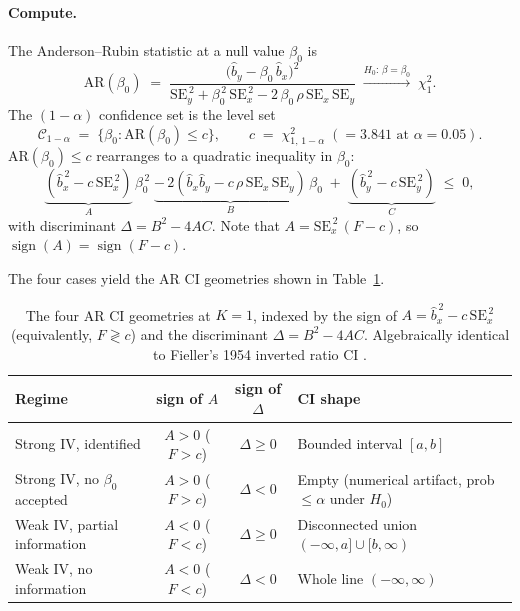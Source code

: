 \documentclass[11pt]{article}
\begin{document}
\paragraph{Compute.} The Anderson--Rubin statistic at a null value $\beta_0$ is \citep{AndersonRubin1949,WangKang2022}
\begin{equation}
\mathrm{AR}(\beta_0) \;=\; \frac{\bigl(\hat b_y - \beta_0\,\hat b_x\bigr)^2}{\mathrm{SE}_y^{\,2} + \beta_0^{\,2}\,\mathrm{SE}_x^{\,2} - 2\,\beta_0\,\rho\,\mathrm{SE}_x\,\mathrm{SE}_y} \;\xrightarrow{H_0:\,\beta=\beta_0}\; \chi^2_1.
\label{eq:ARK1}
\end{equation}
The $(1-\alpha)$ confidence set is the level set
\begin{equation}
\mathcal{C}_{1-\alpha} \;=\; \bigl\{\beta_0 : \mathrm{AR}(\beta_0) \le c\bigr\},\qquad c \;=\; \chi^2_{1,\,1-\alpha}\;(=3.841\text{ at }\alpha=0.05).
\label{eq:CSK1}
\end{equation}
$\mathrm{AR}(\beta_0)\le c$ rearranges to a quadratic inequality in $\beta_0$:
\begin{equation}
\underbrace{(\hat b_x^{\,2}-c\,\mathrm{SE}_x^{\,2})}_{A}\,\beta_0^{\,2} \;\underbrace{-\,2(\hat b_x\hat b_y - c\,\rho\,\mathrm{SE}_x\,\mathrm{SE}_y)}_{B}\,\beta_0 \;+\; \underbrace{(\hat b_y^{\,2}-c\,\mathrm{SE}_y^{\,2})}_{C} \;\le\; 0,
\label{eq:quadK1}
\end{equation}
with discriminant $\Delta = B^2 - 4AC$. Note that $A = \mathrm{SE}_x^{\,2}\,(F-c)$, so $\operatorname{sign}(A) = \operatorname{sign}(F-c)$.

\medskip
The four cases yield the AR CI geometries shown in Table~\ref{tab:K1shapes}.

\begin{table}[h]
\centering
\small
\begin{tabular}{lccl}
\toprule
Regime & sign of $A$ & sign of $\Delta$ & CI shape \\
\midrule
Strong IV, identified & $A>0$ ($F>c$) & $\Delta\ge 0$ & Bounded interval $[a,b]$ \\
Strong IV, no $\beta_0$ accepted & $A>0$ ($F>c$) & $\Delta<0$ & Empty (numerical artifact, prob $\le \alpha$ under $H_0$) \\
Weak IV, partial information & $A<0$ ($F<c$) & $\Delta\ge 0$ & Disconnected union $(-\infty,a]\cup[b,\infty)$ \\
Weak IV, no information & $A<0$ ($F<c$) & $\Delta<0$ & Whole line $(-\infty,\infty)$ \\
\bottomrule
\end{tabular}
\caption{The four AR CI geometries at $K=1$, indexed by the sign of $A=\hat b_x^{\,2}-c\,\mathrm{SE}_x^{\,2}$ (equivalently, $F\gtrless c$) and the discriminant $\Delta=B^2-4AC$. Algebraically identical to Fieller's 1954 inverted ratio CI \citep{Fieller1954}.}
\label{tab:K1shapes}
\end{table}
\end{document}
